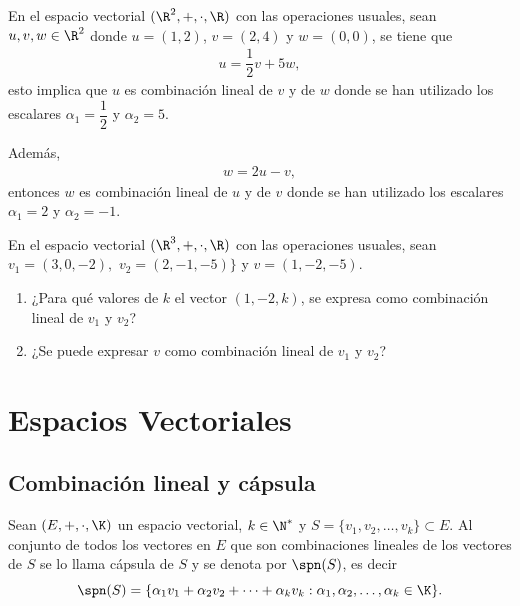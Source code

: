 \documentclass[compacto,10pt]{pubciencias-notas}
\begin{document}
\begin{ejem}\hspace{0pt} En el espacio vectorial $(\R^{2}, +, \cdot, \R)$ con las operaciones usuales, sean $u, v, w\in \R^{2}$ donde $u = (1, 2)$, $v = (2, 4)$ y $w = (0,0)$, se tiene que
\begin{gather}
\label{Comb_Lin1}
u = \dfrac{1}{2}v + 5w,
\end{gather}
esto implica que $u$ es combinación lineal de $v$ y de $w$ donde se han utilizado los escalares $\alpha_{1} = \dfrac{1}{2}$ y $\alpha_{2} = 5$.

\noindent Además,
\begin{gather}
\label{Comb_Lin2}
    w = 2u - v,
\end{gather}
entonces $w$ es combinación lineal de $u$ y de $v$ donde se han utilizado los escalares $\alpha_{1} = 2$ y $\alpha_{2} = - 1$.
\end{ejem}

\begin{ejer}\hspace{0pt} En el espacio vectorial $(\R^{3},+,\cdot,\R)$ con las operaciones usuales, sean $v_{1} = (3,0,-2),$ $v_{2}= (2,-1,-5)\}$ y $v=(1,-2,-5)$.
\begin{enumerate}
    \item ¿Para qué valores de $k$ el vector $(1,-2,k)$, se expresa como combinación lineal de $v_{1}$ y $v_{2}$?
    \item ¿Se puede expresar $v$ como combinación lineal de $v_{1}$ y $v_{2}$?
\end{enumerate}
\end{ejer}

\setcounter{section}{3}
\section{Espacios Vectoriales}
\setcounter{subsection}{3}
\subsection{Combinación lineal y cápsula}

\begin{defi}
Sean $(E,+,\cdot,\K)$ un espacio vectorial, $k\in\N^{*}$ y $S = \{v_1, v_2, \ldots, v_k\} \subset E$. Al conjunto de todos los vectores en $E$ que son combinaciones lineales de los vectores de $S$ se lo llama cápsula de $S$ y se denota por $\spn(S)$, es decir
    \[
        \spn(S) = \{\alpha_1 v_1 + \alpha_2 v_2 + \cdots + \alpha_k v_k:\alpha_1, \alpha_2, \ldots, \alpha_k \in \K\}.
    \]
\end{defi}
\end{document}
